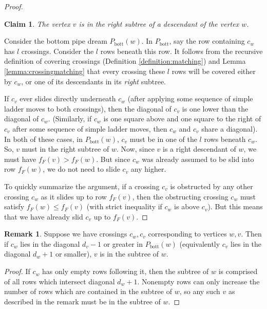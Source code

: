 \documentclass{article}
\newtheorem{claim}[theorem]{Claim}
\theoremstyle{definition} %
\newtheorem{remark}[theorem]{Remark}
\newcommand{\Dora}[1]{{\color{red} \sf $\clubsuit$ Dora: [#1]}}
\begin{document}
\begin{proof}
    \begin{claim} The vertex $v$ is in the right subtree of a descendant of the vertex $w$. 
    \end{claim}

    Consider the bottom pipe dream $P_{\text{bott}}(w)$. In $P_{\text{bott}}$, say the row containing $c_w$ has $l$ crossings. Consider the $l$ rows beneath this row. It follows from the recursive definition of covering crossings (Definition \ref{definition:matching}) and Lemma \ref{lemma:crossingmatching} that every crossing these $l$ rows will be covered either by $c_w$, or one of its descendants in its \textit{right} subtree. 

    If $c_v$ ever slides directly underneath $c_w$ (after applying some sequence of simple ladder moves to both crossings), then the diagonal of $c_v$ is one lower than the diagonal of $c_w$. (Similarly, if $c_w$ is one square above and one square to the right of $c_v$ after some sequence of simple ladder moves, then $c_w$ and $c_v$ share a diagonal). In both of these cases, in $P_{\text{bott}}(w)$, $c_v$ must be in one of the $l$ rows beneath $c_w$.  
    So, $v$ must in the right subtree of $w$. Now, since $v$ is a right descendant of $w$, we must have $f_F(v) > f_F(w)$. But since $c_w$ was already assumed to be slid into row $f_F(w)$, we do not need to slide $c_v$ any higher. 

    To quickly summarize the argument, if a crossing $c_v$ is obstructed by any other crossing $c_w$ as it slides up to row $f_F(v)$, then the obstructing crossing $c_w$ must satisfy $f_F(w) \leq f_F(v)$ (with strict inequality if $c_w$ is above $c_v$). But this means that we have already slid $c_v$ up to $f_F(v)$.
\end{proof}

\begin{remark}\label{rmk:diagonalremark}
Suppose we have crossings $c_w,c_v$ corresponding to vertices $w,v$. Then if $c_w$ lies in the diagonal $d_v-1$ or greater in $P_{\text{bott}}(w)$ (equivalently $c_v$ lies in the diagonal $d_w+1$ or smaller), $v$ is in the subtree of $w$. 
\end{remark}
\begin{proof}
If $c_w$ has only empty rows following it, then the subtree of $w$ is comprised of all rows which intersect diagonal $d_w+1$. Nonempty rows can only increase the number of rows which are contained in the subtree of $w$, so any such $v$ as described in the remark must be in the subtree of $w$.
\end{proof}
\end{document}
